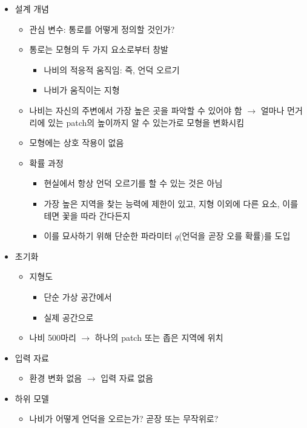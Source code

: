 \documentclass[hyperref={unicode}]{beamer}
\begin{document}
\begin{frame}
\begin{itemize}
\item 설계 개념
	\begin{itemize}
	\item 관심 변수: 통로를 어떻게 정의할 것인가?
	\item 통로는 모형의 두 가지 요소로부터 창발
		\begin{itemize}
		\item 나비의 적응적 움직임: 즉, 언덕 오르기
		\item 나비가 움직이는 지형
		\end{itemize}
	\item 나비는 자신의 주변에서 가장 높은 곳을 파악할 수 있어야 함 $\rightarrow$ 얼마나 먼거리에 있는 patch의 높이까지 알 수 있는가로 모형을 변화시킴
	\item 모형에는 상호 작용이 없음
	\item 확률 과정
		\begin{itemize}
		\item 현실에서 항상 언덕 오르기를 할 수 있는 것은 아님
		\item 가장 높은 지역을 찾는 능력에 제한이 있고, 지형 이외에 다른 요소, 이를 테면 꽃을 따라 간다든지
		\item 이를 묘사하기 위해 단순한 파라미터 $q$(언덕을 곧장 오를 확률)를 도입
		\end{itemize}
	\end{itemize}
\end{itemize}
\end{frame}

\begin{frame}
\begin{itemize}
\item 초기화
	\begin{itemize}
	\item 지형도
		\begin{itemize}
		\item 단순 가상 공간에서
		\item 실제 공간으로
		\end{itemize}
	\item 나비 500마리  $\rightarrow$ 하나의 patch 또는 좁은 지역에 위치
	\end{itemize}
\item 입력 자료
	\begin{itemize}
	\item 환경 변화 없음 $\rightarrow$ 입력 자료 없음
	\end{itemize}
\item 하위 모델
	\begin{itemize}
	\item 나비가 어떻게 언덕을 오르는가? 곧장 또는 무작위로? 
	\end{itemize}
\end{itemize}
\end{frame}
\end{document}
